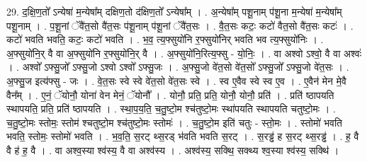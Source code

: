 \documentclass[17pt]{extarticle}
\begin{document}
29. द॒क्षि॒ण॒तो᳚ ऽन्येषा॑ म॒न्येषा᳚म् दक्षिण॒तो द॑क्षिण॒तो᳚ ऽन्येषा᳚म् । . अ॒न्येषा᳚म् पशू॒नाम् प॑शू॒ना म॒न्येषा॑ म॒न्येषा᳚म् पशू॒नाम् । . प॒शू॒नां ॅवै॑त॒सो वै॑त॒सः प॑शू॒नाम् प॑शू॒नां ॅवै॑त॒सः । . वै॒त॒सः कटः॒ कटो॑ वैत॒सो वै॑त॒सः कटः॑ । . कटो॑ भवति भवति॒ कटः॒ कटो॑ भवति । . भ॒व॒ त्य॒फ्सुयो॑नि र॒फ्सुयो॑निर् भवति भव त्य॒फ्सुयो॑निः । . अ॒फ्सुयो॑नि॒र् वै वा अ॒फ्सुयो॑नि र॒फ्सुयो॑नि॒र् वै । . अ॒फ्सुयो॑नि॒रित्य॒फ्सु - यो॒निः॒ । . वा अश्वो ऽश्वो॒ वै वा अश्वः॑ । . अश्वो᳚ ऽफ्सु॒जो᳚ ऽफ्सु॒जो ऽश्वो ऽश्वो᳚ ऽफ्सु॒जः । . अ॒फ्सु॒जो वे॑त॒सो वे॑त॒सो᳚ ऽफ्सु॒जो᳚ ऽफ्सु॒जो वे॑त॒सः । . अ॒फ्सु॒ज इत्य॑फ्सु - जः । . वे॒त॒सः स्वे स्वे वे॑त॒सो वे॑त॒सः स्वे । . स्व ए॒वैव स्वे स्व ए॒व । . ए॒वैन॑ मेन मे॒वै वैन᳚म् । . ए॒नं॒ ॅयोनौ॒ योना॑ वेन मेनं॒ ॅयोनौ᳚ । . योनौ॒ प्रति॒ प्रति॒ योनौ॒ योनौ॒ प्रति॑ । . प्रति॑ ष्ठापयति स्थापयति॒ प्रति॒ प्रति॑ ष्ठापयति । . स्था॒प॒य॒ति॒ च॒तु॒ष्टो॒म श्च॑तुष्टो॒मः स्था॑पयति स्थापयति चतुष्टो॒मः । . च॒तु॒ष्टो॒मः स्तोमः॒ स्तोम॑ श्चतुष्टो॒म श्च॑तुष्टो॒मः स्तोमः॑ । . च॒तु॒ष्टो॒म इति॑ चतुः - स्तो॒मः । . स्तोमो॑ भवति भवति॒ स्तोमः॒ स्तोमो॑ भवति । . भ॒व॒ति॒ स॒रट् थ्स॒रड् भ॑वति भवति स॒रट् । . स॒रड्ढ॑ ह स॒रट् थ्स॒रड्ढ॑ । . ह॒ वै वै ह॑ ह॒ वै । . वा अश्व॒स्या श्व॑स्य॒ वै वा अश्व॑स्य । . अश्व॑स्य॒ सक्थि॒ सक्थ्य श्व॒स्या श्व॑स्य॒ सक्थि॑ । \newline
\end{document}
